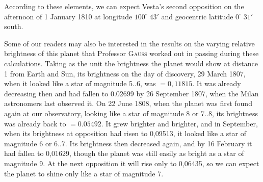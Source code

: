 \par\indent According to these elements, we can expect Vesta’s second opposition on the afternoon of 1 January 1810 at longitude $100^\circ\;43'$ and geocentric latitude $0^\circ\;31'$ south.

\par\indent Some of our readers may also be interested in the results on the varying relative brightness of this planet that Professor \textsc{Gauss} worked out in passing during these calculations. Taking as the unit the brightness the planet would show at distance 1 from Earth and Sun, its brightness on the day of discovery, 29 March 1807, when it looked like a star of magnitude 5..6, was $= 0,11815$. It was already decreasing then and had fallen to 0.02699 by 26 September 1807, when the Milan astronomers last observed it. On 22 June 1808, when the planet was first found again at our observatory, looking like a star of magnitude 8 or 7..8, its brightness was already back to $= 0.05492$. It grew brighter and brighter, and in September, when its brightness at opposition had risen to 0,09513, it looked like a star of magnitude 6 or 6..7. Its brightness then decreased again, and by 16 February it had fallen to 0,01629, though the planet was still easily as bright as a star of magnitude 9. At the next opposition it will rise only to 0,06435, so we can expect the planet to shine only like a star of magnitude 7.
